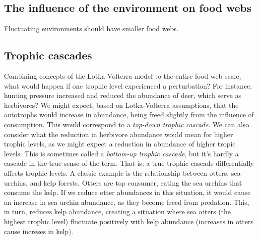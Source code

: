 \documentclass[12pt]{article}
\begin{document}
\bigskip
\subsection*{The influence of the environment on food webs}

Fluctuating environments should have smaller food webs. 






















\bigskip
\subsection*{Trophic cascades}

Combining concepts of the Lotka-Volterra model to the entire food web scale, what would happen if one trophic level experienced a perturbation? For instance, hunting pressure increased and reduced the abundance of deer, which serve as herbivores? We might expect, based on Lotka-Volterra assumptions, that the autotrophs would increase in abundance, being freed slightly from the influence of consumption. This would correspond to a \textit{top-down trophic cascade}. We can also consider what the reduction in herbivore abundance would mean for higher trophic levels, as we might expect a reduction in abundance of higher tropic levels. This is sometimes called a \textit{bottom-up trophic cascade}, but it's hardly a cascade in the true sense of the term. That is, a true trophic cascade differentially affects trophic levels. A classic example is the relationship between otters, sea urchins, and kelp forests. Otters are top consumer, eating the sea urchins that consume the kelp. If we reduce otter abundances in this situation, it would cause an increase in sea urchin abundance, as they become freed from predation. This, in turn, reduces kelp abundance, creating a situation where sea otters (the highest trophic level) fluctuate positively with kelp abundance (increases in otters cause increses in kelp). 


















\bigskip
\subsection*{}
\end{document}
